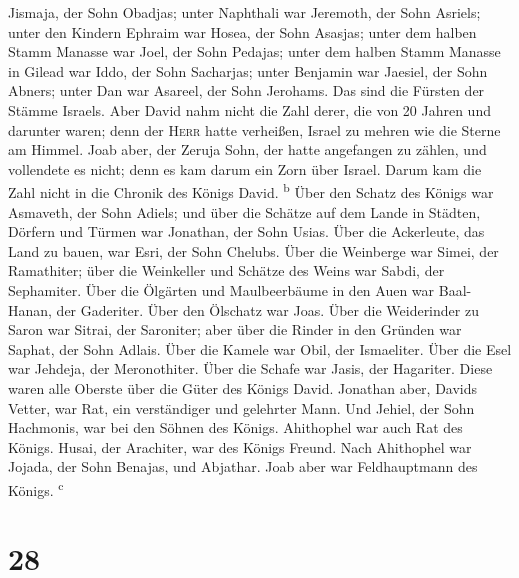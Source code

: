 Jismaja, der Sohn Obadjas; unter Naphthali war Jeremoth, der Sohn
Asriels;  unter den Kindern Ephraim war Hosea, der Sohn
Asasjas; unter dem halben Stamm Manasse war Joel, der Sohn Pedajas;
 unter dem halben Stamm Manasse in Gilead war Iddo, der
Sohn Sacharjas; unter Benjamin war Jaesiel, der Sohn Abners;
 unter Dan war Asareel, der Sohn Jerohams. Das sind die
Fürsten der Stämme Israels.  Aber David nahm nicht die
Zahl derer, die von 20 Jahren und darunter waren; denn der \textsc{Herr}
hatte verheißen, Israel zu mehren wie die Sterne am Himmel.
 Joab aber, der Zeruja Sohn, der hatte angefangen zu
zählen, und vollendete es nicht; denn es kam darum ein Zorn über Israel.
Darum kam die Zahl nicht in die Chronik des Königs David.
\textsuperscript{b}  Über den Schatz des Königs war
Asmaveth, der Sohn Adiels; und über die Schätze auf dem Lande in
Städten, Dörfern und Türmen war Jonathan, der Sohn Usias.
 Über die Ackerleute, das Land zu bauen, war Esri, der
Sohn Chelubs.  Über die Weinberge war Simei, der
Ramathiter; über die Weinkeller und Schätze des Weins war Sabdi, der
Sephamiter.  Über die Ölgärten und Maulbeerbäume in den
Auen war Baal-Hanan, der Gaderiter. Über den Ölschatz war Joas.
 Über die Weiderinder zu Saron war Sitrai, der Saroniter;
aber über die Rinder in den Gründen war Saphat, der Sohn Adlais.
 Über die Kamele war Obil, der Ismaeliter. Über die Esel
war Jehdeja, der Meronothiter.  Über die Schafe war
Jasis, der Hagariter. Diese waren alle Oberste über die Güter des Königs
David.  Jonathan aber, Davids Vetter, war Rat, ein
verständiger und gelehrter Mann. Und Jehiel, der Sohn Hachmonis, war bei
den Söhnen des Königs.  Ahithophel war auch Rat des
Königs. Husai, der Arachiter, war des Königs Freund. 
Nach Ahithophel war Jojada, der Sohn Benajas, und Abjathar. Joab aber
war Feldhauptmann des Königs. \textsuperscript{c}

\hypertarget{section-27}{%
\section{28}\label{section-27}}

